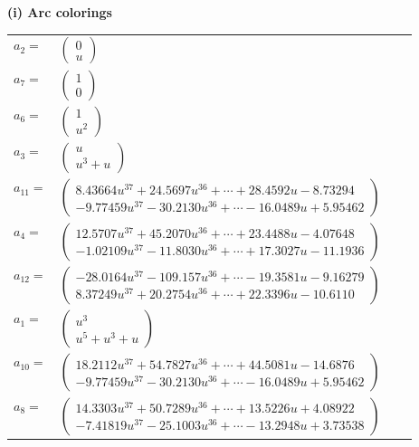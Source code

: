 \documentclass[1p]{elsarticle_modified}
\theoremstyle{definition}
\begin{document}
\flushleft \textbf{(i) Arc colorings}\\
\begin{tabular}{m{7pt} m{180pt} m{7pt} m{180pt} }
\flushright $a_{2}=$&$\begin{pmatrix}0\\u\end{pmatrix}$ \\
\flushright $a_{7}=$&$\begin{pmatrix}1\\0\end{pmatrix}$ \\
\flushright $a_{6}=$&$\begin{pmatrix}1\\u^2\end{pmatrix}$ \\
\flushright $a_{3}=$&$\begin{pmatrix}u\\u^3+u\end{pmatrix}$ \\
\flushright $a_{11}=$&$\begin{pmatrix}8.43664 u^{37}+24.5697 u^{36}+\cdots+28.4592 u-8.73294\\-9.77459 u^{37}-30.2130 u^{36}+\cdots-16.0489 u+5.95462\end{pmatrix}$ \\
\flushright $a_{4}=$&$\begin{pmatrix}12.5707 u^{37}+45.2070 u^{36}+\cdots+23.4488 u-4.07648\\-1.02109 u^{37}-11.8030 u^{36}+\cdots+17.3027 u-11.1936\end{pmatrix}$ \\
\flushright $a_{12}=$&$\begin{pmatrix}-28.0164 u^{37}-109.157 u^{36}+\cdots-19.3581 u-9.16279\\8.37249 u^{37}+20.2754 u^{36}+\cdots+22.3396 u-10.6110\end{pmatrix}$ \\
\flushright $a_{1}=$&$\begin{pmatrix}u^3\\u^5+u^3+u\end{pmatrix}$ \\
\flushright $a_{10}=$&$\begin{pmatrix}18.2112 u^{37}+54.7827 u^{36}+\cdots+44.5081 u-14.6876\\-9.77459 u^{37}-30.2130 u^{36}+\cdots-16.0489 u+5.95462\end{pmatrix}$ \\
\flushright $a_{8}=$&$\begin{pmatrix}14.3303 u^{37}+50.7289 u^{36}+\cdots+13.5226 u+4.08922\\-7.41819 u^{37}-25.1003 u^{36}+\cdots-13.2948 u+3.73538\end{pmatrix}$ \\

\end{tabular}
\end{document}
